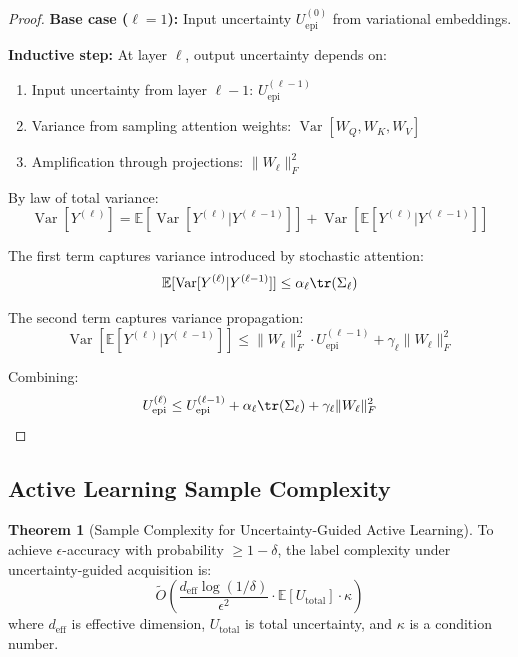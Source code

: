 \documentclass[12pt,a4paper]{article}
\theoremstyle{definition}
\newtheorem{theorem}{Theorem}[section]
\DeclareMathOperator{\Var}{Var}
\begin{document}
\begin{proof}
\textbf{Base case ($\ell=1$):} Input uncertainty $U_{\text{epi}}^{(0)}$ from variational embeddings.

\textbf{Inductive step:} At layer $\ell$, output uncertainty depends on:
\begin{enumerate}
\item Input uncertainty from layer $\ell-1$: $U_{\text{epi}}^{(\ell-1)}$
\item Variance from sampling attention weights: $\Var[W_Q, W_K, W_V]$
\item Amplification through projections: $\|W_\ell\|_F^2$
\end{enumerate}

By law of total variance:
\begin{equation}
\Var[Y^{(\ell)}] = \mathbb{E}[\Var[Y^{(\ell)}|Y^{(\ell-1)}]] + \Var[\mathbb{E}[Y^{(\ell)}|Y^{(\ell-1)}]]
\end{equation}

The first term captures variance introduced by stochastic attention:
\begin{equation}
\mathbb{E}[\Var[Y^{(\ell)}|Y^{(\ell-1)}]] \leq \alpha_\ell \tr(\Sigma_\ell)
\end{equation}

The second term captures variance propagation:
\begin{equation}
\Var[\mathbb{E}[Y^{(\ell)}|Y^{(\ell-1)}]] \leq \|W_\ell\|_F^2 \cdot U_{\text{epi}}^{(\ell-1)} + \gamma_\ell \|W_\ell\|_F^2
\end{equation}

Combining:
\begin{equation}
U_{\text{epi}}^{(\ell)} \leq U_{\text{epi}}^{(\ell-1)} + \alpha_\ell \tr(\Sigma_\ell) + \gamma_\ell \|W_\ell\|_F^2
\end{equation}
\end{proof}

\subsection{Active Learning Sample Complexity}

\begin{theorem}[Sample Complexity for Uncertainty-Guided Active Learning]
\label{thm:active_learning}
To achieve $\epsilon$-accuracy with probability $\ge 1-\delta$, the label complexity under uncertainty-guided acquisition is:
\begin{equation}
\tilde{O}\left(\frac{d_{\text{eff}}\log(1/\delta)}{\epsilon^2} \cdot \mathbb{E}[U_{\text{total}}] \cdot \kappa\right)
\end{equation}
where $d_{\text{eff}}$ is effective dimension, $U_{\text{total}}$ is total uncertainty, and $\kappa$ is a condition number.
\end{theorem}
\end{document}
